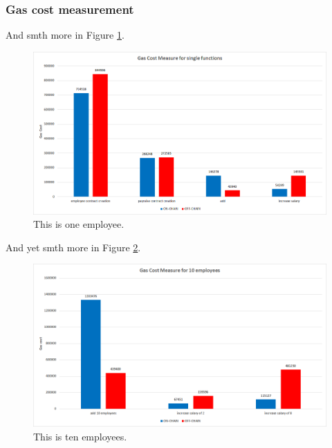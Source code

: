 \subsubsection{Gas cost measurement}

And smth more in Figure \ref{fig:05_gas_cost_single}.

\begin{figure}[!htb]
\centering
\includegraphics[width=1.0\textwidth]{images/05_gas_cost_single.png}
\caption{\label{fig:05_gas_cost_single}This is one employee.}
\end{figure}

And yet smth more in Figure \ref{fig:05_gas_cost_ten}.

\begin{figure}[!htb]
\centering
\includegraphics[width=1.0\textwidth]{images/05_gas_cost_ten.png}
\caption{\label{fig:05_gas_cost_ten}This is ten employees.}
\end{figure}